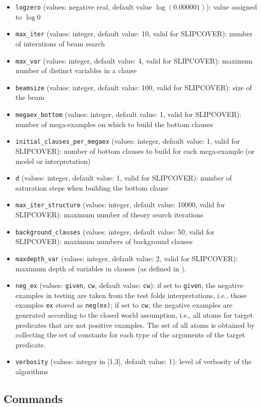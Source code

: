 \documentclass[a4paper,10pt]{article}
\begin{document}
\begin{itemize}
\item \verb|logzero| (values: negative real, default value $\log(0.000001)$): value assigned to $\log 0$
\item \verb|max_iter| (values: integer, default value: 10, valid for  SLIPCOVER): number of interations of beam search
\item \verb|max_var| (values: integer, default value: 4, valid for 
SLIPCOVER): maximum number of distinct variables in a clause
\item \verb|beamsize|  (values: integer, default value: 100, valid for SLIPCOVER): size of the beam 
\item \verb|megaex_bottom| (values: integer, default value: 1, valid for SLIPCOVER): number of mega-examples on which to build the bottom clauses
\item \verb|initial_clauses_per_megaex| (values: integer, default value: 1, valid for SLIPCOVER): 
 number of bottom clauses to build for each mega-example (or 
 model or interpretation)
\item \verb|d| (values: integer, default value: 1, valid for SLIPCOVER): 
 number of saturation steps when building the bottom clause
\item \verb|max_iter_structure| (values: integer, default value: 10000, valid for SLIPCOVER): 
maximum  number of theory search iterations
\item \verb|background_clauses| (values: integer, default value: 50, valid for SLIPCOVER): 
 maximum numbers of background clauses
\item \verb|maxdepth_var| (values: integer, default value: 2, valid for SLIPCOVER): maximum depth of
variables in clauses (as defined in \cite{DBLP:journals/ai/Cohen95}).
\item \verb|neg_ex| (values:  \verb|given|, \verb|cw|, default value: \verb|cw|): if  set to \verb|given|, the negative examples in testing
are taken from the test folds interpretations, i.e., those examples \verb|ex| stored as \verb|neg(ex)|; if set to \verb|cw|, the negative examples are generated according to the closed world assumption, i.e., all atoms for target predicates that are not positive examples. The set of all atoms is obtained by collecting the set of constants for each type of the arguments of the target predicate.
\item \verb|verbosity| (values: integer in [1,3], default value: 1): level of verbosity of the algorithms
\end{itemize}
\subsection{Commands}
\end{document}
